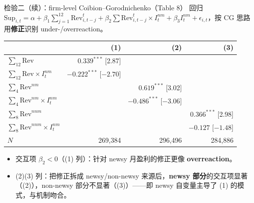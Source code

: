 \documentclass[aspectratio=169,10pt]{beamer}
\newcommand{\tighttable}{\scriptsize\setlength{\tabcolsep}{3pt}\renewcommand{\arraystretch}{1.12}}
\begin{document}
\begin{frame}{检验二（续）：firm-level Coibion--Gorodnichenko（Table 8）}
	回归 $\mathrm{Sup}_{i,t}=\alpha+\beta_1\sum_{j=1}^{12}\mathrm{Rev}^{t}_{i,t-j}+\beta_2\sum\mathrm{Rev}^{t}_{i,t-j}\times I^{nm}_t+\beta_3 I^{nm}_t+\epsilon_{i,t}$，按 CG 思路用\textbf{修正}识别 under-/overreaction。
	\tighttable
	\begin{tabular}{lrrr}
		\toprule
		& (1) & (2) & (3) \\
		\midrule
		$\sum_{12}\mathrm{Rev}$ & $0.339^{***}$ [2.87] & & \\
		$\sum_{12}\mathrm{Rev}\times I^{nm}_t$ & $-0.222^{***}$ [$-2.70$] & & \\
		$\sum_{4}\mathrm{Rev}^{nm}$ & & $0.619^{***}$ [3.02] & \\
		$\sum_{4}\mathrm{Rev}^{nm}\times I^{nm}_t$ & & $-0.486^{***}$ [$-3.06$] & \\
		$\sum_{8}\mathrm{Rev}^{nnm}$ & & & $0.366^{***}$ [2.98] \\
		$\sum_{8}\mathrm{Rev}^{nnm}\times I^{nm}_t$ & & & $-0.127$ [$-1.48$] \\
		$N$ & 269{,}384 & 296{,}496 & 284{,}886 \\
		\bottomrule
	\end{tabular}
	\vspace{3pt}
	\begin{itemize}
		\item 交互项 $\beta_2<0$（(1) 列）：针对 newsy 月盈利的修正更像 \textbf{overreaction}。
		\item (2)(3) 列：把修正拆成 newsy/non-newsy 来源后，\textbf{newsy 部分}的交互项显著（(2)），non-newsy 部分不显著（(3)）——即 newsy 自变量主导了 (1) 的模式，与机制吻合。
	\end{itemize}
\end{frame}
\end{document}
